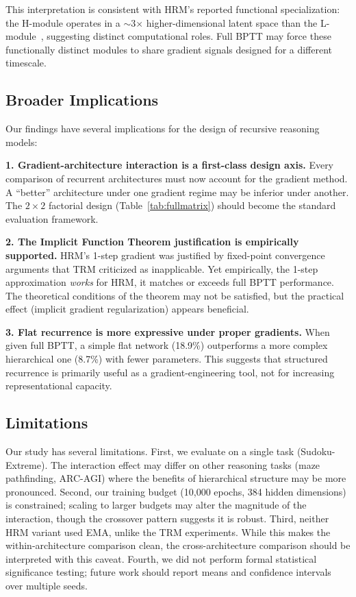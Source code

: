 \documentclass{article}
\begin{document}
This interpretation is consistent with HRM's reported functional specialization: the H-module operates in a $\sim$3$\times$ higher-dimensional latent space than the L-module~\cite{wang2025hrm}, suggesting distinct computational roles. Full BPTT may force these functionally distinct modules to share gradient signals designed for a different timescale.

\subsection{Broader Implications}

Our findings have several implications for the design of recursive reasoning models:

\textbf{1. Gradient-architecture interaction is a first-class design axis.} Every comparison of recurrent architectures must now account for the gradient method. A ``better'' architecture under one gradient regime may be inferior under another. The $2\times2$ factorial design (Table~\ref{tab:fullmatrix}) should become the standard evaluation framework.

\textbf{2. The Implicit Function Theorem justification is empirically supported.} HRM's 1-step gradient was justified by fixed-point convergence arguments that TRM criticized as inapplicable. Yet empirically, the 1-step approximation \emph{works} for HRM, it matches or exceeds full BPTT performance. The theoretical conditions of the theorem may not be satisfied, but the practical effect (implicit gradient regularization) appears beneficial.

\textbf{3. Flat recurrence is more expressive under proper gradients.} When given full BPTT, a simple flat network (18.9\%) outperforms a more complex hierarchical one (8.7\%) with fewer parameters. This suggests that structured recurrence is primarily useful as a gradient-engineering tool, not for increasing representational capacity.

\subsection{Limitations}

Our study has several limitations. First, we evaluate on a single task (Sudoku-Extreme). The interaction effect may differ on other reasoning tasks (maze pathfinding, ARC-AGI) where the benefits of hierarchical structure may be more pronounced. Second, our training budget (10,000 epochs, 384 hidden dimensions) is constrained; scaling to larger budgets may alter the magnitude of the interaction, though the crossover pattern suggests it is robust. Third, neither HRM variant used EMA, unlike the TRM experiments. While this makes the within-architecture comparison clean, the cross-architecture comparison should be interpreted with this caveat. Fourth, we did not perform formal statistical significance testing; future work should report means and confidence intervals over multiple seeds.
\end{document}
